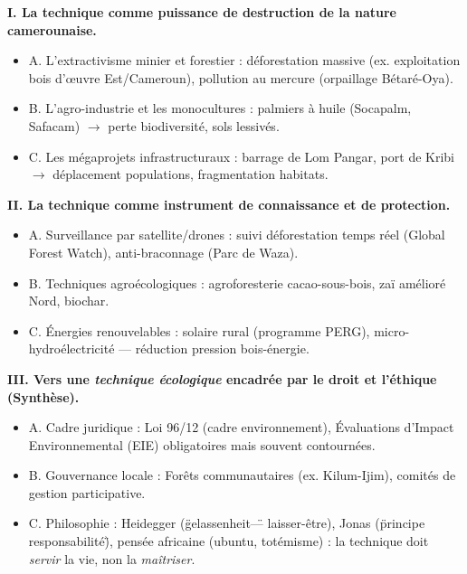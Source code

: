 \documentclass[11pt]{article}
\begin{document}
\begin{propriete}
\textbf{I. La technique comme puissance de destruction de la nature camerounaise.}
\begin{itemize}
\item A. L'extractivisme minier et forestier : déforestation massive (ex. exploitation bois d'œuvre Est/Cameroun), pollution au mercure (orpaillage Bétaré-Oya).
\item B. L'agro-industrie et les monocultures : palmiers à huile (Socapalm, Safacam) $\rightarrow$ perte biodiversité, sols lessivés.
\item C. Les mégaprojets infrastructuraux : barrage de Lom Pangar, port de Kribi $\rightarrow$ déplacement populations, fragmentation habitats.
\end{itemize}
\textbf{II. La technique comme instrument de connaissance et de protection.}
\begin{itemize}
\item A. Surveillance par satellite/drones : suivi déforestation temps réel (Global Forest Watch), anti-braconnage (Parc de Waza).
\item B. Techniques agroécologiques : agroforesterie cacao-sous-bois, zaï amélioré Nord, biochar.
\item C. Énergies renouvelables : solaire rural (programme PERG), micro-hydroélectricité — réduction pression bois-énergie.
\end{itemize}
\textbf{III. Vers une \emph{technique écologique} encadrée par le droit et l'éthique (Synthèse).}
\begin{itemize}
\item A. Cadre juridique : Loi 96/12 (cadre environnement), Évaluations d'Impact Environnemental (EIE) obligatoires mais souvent contournées.
\item B. Gouvernance locale : Forêts communautaires (ex. Kilum-Ijim), comités de gestion participative.
\item C. Philosophie : Heidegger (\"gelassenheit\" — laisser-être), Jonas (\"principe responsabilité\"), pensée africaine (ubuntu, totémisme) : la technique doit \emph{servir} la vie, non la \emph{maîtriser}.
\end{itemize}
\end{propriete}
\end{document}
